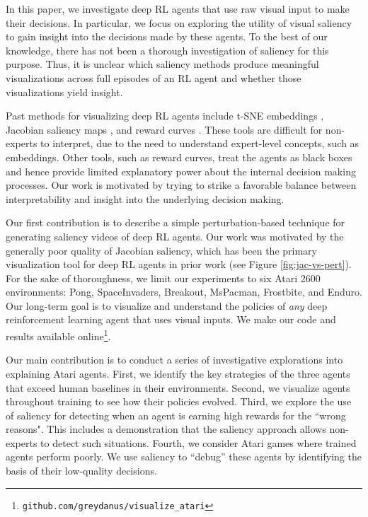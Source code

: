 \documentclass{article}
\begin{document}
In this paper, we investigate deep RL agents that use raw visual input to make their decisions. In particular, we focus on exploring the utility of visual saliency to gain insight into the decisions made by these agents. To the best of our knowledge, there has not been a thorough investigation of saliency for this purpose. Thus, it is unclear which saliency methods produce meaningful visualizations across full episodes of an RL agent and whether those visualizations yield insight.

Past methods for visualizing deep RL agents include t-SNE embeddings \cite{Mnih2015Human-levelLearning, Zahavy2016GrayingDQNs}, Jacobian saliency maps \cite{Wang2016DuelingLearning, Zahavy2016GrayingDQNs}, and reward curves \cite{Mnih2015Human-levelLearning}. These tools are difficult for non-experts to interpret, due to the need to understand expert-level concepts, such as embeddings. Other tools, such as reward curves, treat the agents as black boxes and hence provide limited explanatory power about the internal decision making processes. Our  work is motivated by trying to strike a favorable balance between interpretability and insight into the underlying decision making.

Our first contribution is to describe a simple perturbation-based technique for generating saliency videos of deep RL agents. Our work was motivated by the generally poor quality of Jacobian saliency, which has been the primary visualization tool for deep RL agents in prior work (see Figure \ref{fig:jac-vs-pert}). For the sake of thoroughness, we limit our experiments to six Atari 2600 environments: Pong, SpaceInvaders, Breakout, MsPacman, Frostbite, and Enduro. Our long-term goal is to visualize and understand the policies of \textit{any} deep reinforcement learning agent that uses visual inputs. We make our code and results available online\footnote{\texttt{github.com/greydanus/visualize\_atari}}.


Our main contribution is to conduct a series of investigative explorations into explaining Atari agents. First, we identify the key strategies of the three agents that exceed human baselines in their environments. Second, we visualize agents throughout training to see how their policies evolved. Third, we explore the use of saliency for detecting when an agent is earning high rewards for the ``wrong reasons". This includes a demonstration that the saliency approach allows non-experts to detect such situations. Fourth, we consider Atari games where trained agents perform poorly. We use saliency to ``debug'' these agents by identifying the basis of their low-quality decisions. 
\end{document}
